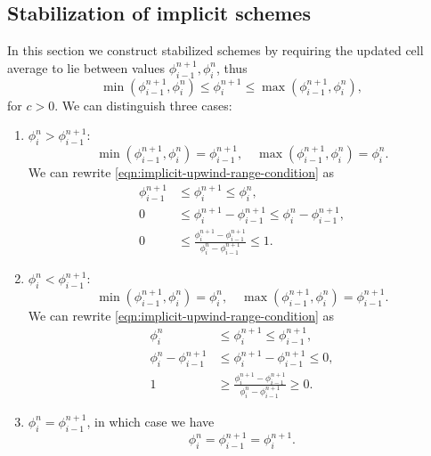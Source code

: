 \documentclass[../thesis.tex]{subfiles}
\begin{document}
\subsection[]{Stabilization of implicit schemes}
In this section we construct stabilized schemes by requiring the updated cell average to lie between values \(\phi_{i-1}^{n+1},\phi_{i}^{n}\), thus
\begin{equation}\label{eqn:implicit-upwind-range-condition}
    \min\left( \phi_{i-1}^{n+1},\phi_{i}^{n} \right)
    \leq
    \phi_{i}^{n+1}
    \leq
    \max\left( \phi_{i-1}^{n+1},\phi_{i}^{n} \right),
\end{equation}
for \(c > 0\). We can distinguish three cases:
\begin{enumerate}
    \item \(\phi_{i}^{n} > \phi_{i-1}^{n+1}:\)
        \[\min\left( \phi_{i-1}^{n+1},\phi_{i}^{n} \right) = \phi_{i-1}^{n+1},\quad
        \max\left( \phi_{i-1}^{n+1},\phi_{i}^{n} \right) = \phi_{i}^{n}.\]
        We can rewrite \eqref{eqn:implicit-upwind-range-condition} as
        \begin{equation*}
            \begin{split}
                \phi_{i-1}^{n+1}
                &\leq
                \phi_{i}^{n+1}
                \leq
                \phi_{i}^{n},
                \\
                0
                &\leq
                \phi_{i}^{n+1} - \phi_{i-1}^{n+1}
                \leq
                \phi_{i}^{n} - \phi_{i-1}^{n+1},
                \\
                0
                &\leq
                \frac{\phi_{i}^{n+1} - \phi_{i-1}^{n+1}}{\phi_{i}^{n} - \phi_{i-1}^{n+1}}
                \leq
                1.
            \end{split}
        \end{equation*}
    \item \(\phi_{i}^{n} < \phi_{i-1}^{n+1}:\)
        \[\min\left( \phi_{i-1}^{n+1},\phi_{i}^{n} \right) = \phi_{i}^{n},\quad
        \max\left( \phi_{i-1}^{n+1},\phi_{i}^{n} \right) = \phi_{i-1}^{n+1}.\]
        We can rewrite \eqref{eqn:implicit-upwind-range-condition} as
        \begin{equation*}
            \begin{split}
                \phi_{i}^{n}
                &\leq
                \phi_{i}^{n+1}
                \leq
                \phi_{i-1}^{n+1},
                \\
                \phi_{i}^{n} - \phi_{i-1}^{n+1}
                &\leq
                \phi_{i}^{n+1} - \phi_{i-1}^{n+1}
                \leq
                0,
                \\
                1
                &\geq
                \frac{\phi_{i}^{n+1} - \phi_{i-1}^{n+1}}{\phi_{i}^{n} - \phi_{i-1}^{n+1}}
                \geq
                0.
            \end{split}
        \end{equation*}
    \item \(\phi_{i}^{n} = \phi_{i-1}^{n+1}\), in which case we have\[\phi_{i}^{n} = \phi_{i-1}^{n+1} = \phi_{i}^{n+1}.\]
\end{enumerate}
\end{document}
